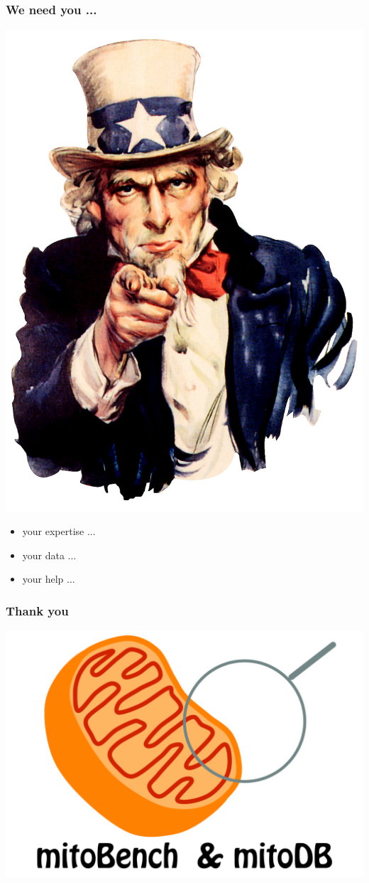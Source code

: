 \documentclass{beamer} %
\begin{document}
\begin{frame}
	\frametitle{We need you ...}
	\centering
	\includegraphics[scale=0.2]{images/weneedyou.jpg}
	\begin{itemize}
		\item your expertise ...
		\item your data ... 
		\item your help ... 
	\end{itemize}
\end{frame}

\begin{frame}
\frametitle{Thank you}
\centering
\includegraphics[scale=0.1]{imagesBench/mitoBenchLogo.jpg}
\end{frame}
\end{document}
